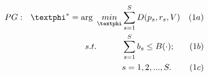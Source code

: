 \documentclass{amsart}
\begin{document}
    \begin{align*}
        PG:\ \ \text{\textphi}^{*} = \text{arg}\ \mathop{min}_{\text{\textphi}} 
                                          & \displaystyle\sum_{s=1}^{S}{D(p_s,r_s,V)} & (1a) \\
        s.t.\ \ \ \ \ \ \ \ \   & \displaystyle\sum_{s=1}^{S}{b_s \leq B(\cdot);} & (1b) \\
        & s = 1,2,...,S. & (1c)
    \end{align*}
\end{document}
